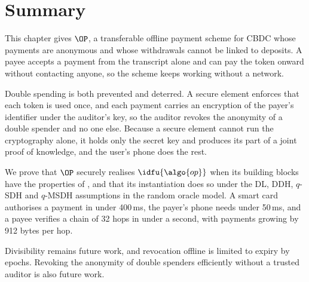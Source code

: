 \FloatBarrier
\section{Summary}\label{sec:offline-summary}

This chapter gives $\OP$, a transferable offline payment scheme for CBDC whose
payments are anonymous and whose withdrawals cannot be linked to deposits. A
payee accepts a payment from the transcript alone and can pay the token onward
without contacting anyone, so the scheme keeps working without a network.

Double spending is both prevented and deterred. A secure element enforces that
each token is used once, and each payment carries an encryption of the payer's
identifier under the auditor's key, so the auditor revokes the anonymity of a
double spender and no one else. Because a secure element cannot run the cryptography alone, it
holds only the secret key and produces its part of a joint proof of knowledge,
and the user's phone does the rest.

We prove that $\OP$ securely realises $\idfu{\algo{op}}$ when its building
blocks have the properties of , and
that its instantiation does so under the DL, DDH, $q$-SDH and $q$-MSDH
assumptions in the random oracle model. A smart card authorises a payment in
under 400\,ms, the payer's phone needs under 50\,ms, and a
payee verifies a chain of 32 hops in under a second, with payments growing by
912 bytes per hop.

Divisibility remains future work, and revocation offline is limited to expiry
by epochs. Revoking the anonymity of double spenders efficiently without a
trusted auditor is also future work.
